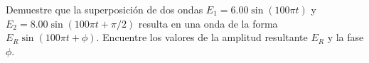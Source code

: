 \item Demuestre que la superposición de dos ondas $E_1 = 6.00 \sin(100\pi t)$ y $E_2 = 8.00 \sin(100\pi t + \pi/2)$ resulta en una onda de la forma $E_R \sin(100\pi t + \phi)$. Encuentre los valores de la amplitud resultante $E_R$ y la fase $\phi$.